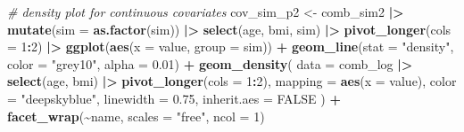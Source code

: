 \documentclass[12pt, twoside]{amherstthesis}
\newenvironment{Shaded}{\begin{snugshade}}{\end{snugshade}}
\newcommand{\AttributeTok}[1]{\textcolor[rgb]{0.13,0.29,0.53}{#1}}
\newcommand{\CommentTok}[1]{\textcolor[rgb]{0.56,0.35,0.01}{\textit{#1}}}
\newcommand{\ConstantTok}[1]{\textcolor[rgb]{0.56,0.35,0.01}{#1}}
\newcommand{\DecValTok}[1]{\textcolor[rgb]{0.00,0.00,0.81}{#1}}
\newcommand{\FloatTok}[1]{\textcolor[rgb]{0.00,0.00,0.81}{#1}}
\newcommand{\FunctionTok}[1]{\textcolor[rgb]{0.13,0.29,0.53}{\textbf{#1}}}
\newcommand{\NormalTok}[1]{#1}
\newcommand{\OtherTok}[1]{\textcolor[rgb]{0.56,0.35,0.01}{#1}}
\newcommand{\SpecialCharTok}[1]{\textcolor[rgb]{0.81,0.36,0.00}{\textbf{#1}}}
\newcommand{\StringTok}[1]{\textcolor[rgb]{0.31,0.60,0.02}{#1}}
\begin{document}
\scriptsize
\begin{Shaded}
\begin{Highlighting}[]
\CommentTok{\# density plot for continuous covariates}
\NormalTok{cov\_sim\_p2 }\OtherTok{\textless{}{-}}\NormalTok{ comb\_sim2 }\SpecialCharTok{|\textgreater{}} 
  \FunctionTok{mutate}\NormalTok{(}\AttributeTok{sim =} \FunctionTok{as.factor}\NormalTok{(sim)) }\SpecialCharTok{|\textgreater{}} 
  \FunctionTok{select}\NormalTok{(age, bmi, sim) }\SpecialCharTok{|\textgreater{}} 
  \FunctionTok{pivot\_longer}\NormalTok{(}\AttributeTok{cols =} \DecValTok{1}\SpecialCharTok{:}\DecValTok{2}\NormalTok{) }\SpecialCharTok{|\textgreater{}}
  \FunctionTok{ggplot}\NormalTok{(}\FunctionTok{aes}\NormalTok{(}\AttributeTok{x =}\NormalTok{ value, }\AttributeTok{group =}\NormalTok{ sim)) }\SpecialCharTok{+}
  \FunctionTok{geom\_line}\NormalTok{(}\AttributeTok{stat =} \StringTok{"density"}\NormalTok{, }\AttributeTok{color =} \StringTok{"grey10"}\NormalTok{, }\AttributeTok{alpha =} \FloatTok{0.01}\NormalTok{) }\SpecialCharTok{+} 
  \FunctionTok{geom\_density}\NormalTok{(}
    \AttributeTok{data =}\NormalTok{ comb\_log }\SpecialCharTok{|\textgreater{}} \FunctionTok{select}\NormalTok{(age, bmi) }\SpecialCharTok{|\textgreater{}} \FunctionTok{pivot\_longer}\NormalTok{(}\AttributeTok{cols =} \DecValTok{1}\SpecialCharTok{:}\DecValTok{2}\NormalTok{),}
    \AttributeTok{mapping =} \FunctionTok{aes}\NormalTok{(}\AttributeTok{x =}\NormalTok{ value), }
    \AttributeTok{color =} \StringTok{"deepskyblue"}\NormalTok{, }\AttributeTok{linewidth =} \FloatTok{0.75}\NormalTok{, }\AttributeTok{inherit.aes =} \ConstantTok{FALSE}
\NormalTok{  ) }\SpecialCharTok{+}
  \FunctionTok{facet\_wrap}\NormalTok{(}\SpecialCharTok{\textasciitilde{}}\NormalTok{name, }\AttributeTok{scales =} \StringTok{"free"}\NormalTok{, }\AttributeTok{ncol =} \DecValTok{1}\NormalTok{)}


\end{Highlighting}
\end{Shaded}
\end{document}
